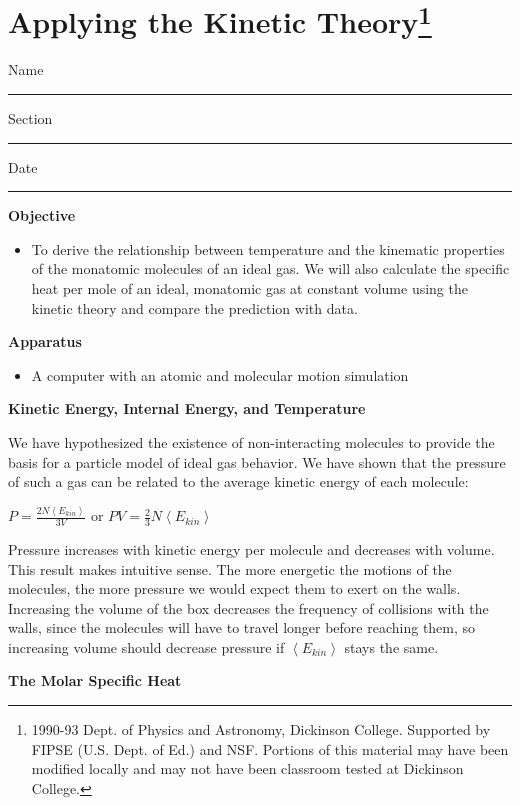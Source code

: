 
\section{Applying the Kinetic Theory\footnote{%
1990-93 Dept. of Physics and Astronomy, Dickinson College. Supported
by FIPSE (U.S. Dept. of Ed.) and NSF. Portions of this material may
have been modified locally and may not have been classroom tested
at Dickinson College.
}}

Name \rule{2.0in}{0.1pt}\hfill{}Section \rule{1.0in}{0.1pt}\hfill{}Date
\rule{1.0in}{0.1pt}

\textbf{Objective}

\begin{itemize}
\item To derive the relationship between temperature and the kinematic properties
of the monatomic molecules of an ideal gas. We will also calculate
the specific heat per mole of an ideal, monatomic gas at constant
volume using the kinetic theory and compare the prediction with data.
\end{itemize}

\textbf{Apparatus}

\begin{itemize}
\item A computer with an atomic and molecular motion simulation
\end{itemize}

\textbf{Kinetic Energy, Internal Energy, and Temperature}

We have hypothesized the existence of non-interacting molecules to
provide the basis for a particle model of ideal gas behavior. We have
shown that the pressure of such a gas can be related to the average
kinetic energy of each molecule:

{\centering \( P=\frac{2N\left\langle E_{kin}\right\rangle }{3V} \)
or \( PV=\frac{2}{3}N\left\langle E_{kin}\right\rangle  \)\par}

Pressure increases with kinetic energy per molecule and decreases
with volume. This result makes intuitive sense. The more energetic
the motions of the molecules, the more pressure we would expect them
to exert on the walls. Increasing the volume of the box decreases
the frequency of collisions with the walls, since the molecules will
have to travel longer before reaching them, so increasing volume should
decrease pressure if \( \left\langle E_{kin}\right\rangle  \) stays
the same.

\textbf{The Molar Specific Heat}

